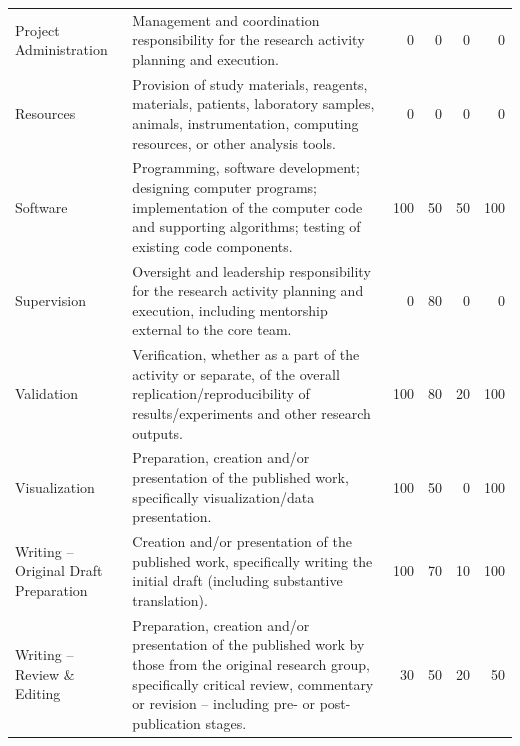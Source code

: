 \documentclass[a4paper,twoside=true,openright,parskip=full,chapterprefix=true,11pt,headings=normal,bibliography=totoc,listof=totoc,titlepage=on,captions=tableabove,draft=false]{scrreprt}
\theoremstyle{definition}
\theoremstyle{definition}
\theoremstyle{definition}
\theoremstyle{remark}
\begin{document}
\begin{table}
\begin{tabular}[t]{llrrrr}
Project Administration & Management and coordination responsibility for the research activity planning and execution. & 0 & 0 & 0 & 0\\
Resources & Provision of study materials, reagents, materials, patients, laboratory samples, animals, instrumentation, computing resources, or other analysis tools. & 0 & 0 & 0 & 0\\
Software & Programming, software development; designing computer programs; implementation of the computer code and supporting algorithms; testing of existing code components. & 100 & 50 & 50 & 100\\
Supervision & Oversight and leadership responsibility for the research activity planning and execution, including mentorship external to the core team. & 0 & 80 & 0 & 0\\
\addlinespace
Validation & Verification, whether as a part of the activity or separate, of the overall replication/reproducibility of results/experiments and other research outputs. & 100 & 80 & 20 & 100\\
Visualization & Preparation, creation and/or presentation of the published work, specifically visualization/data presentation. & 100 & 50 & 0 & 100\\
Writing – Original Draft Preparation & Creation and/or presentation of the published work, specifically writing the initial draft (including substantive translation). & 100 & 70 & 10 & 100\\
Writing – Review \& Editing & Preparation, creation and/or presentation of the published work by those from the original research group, specifically critical review, commentary or revision – including pre- or post-publication stages. & 30 & 50 & 20 & 50\\
\bottomrule
\end{tabular}
\end{table}





% 
\end{document}

